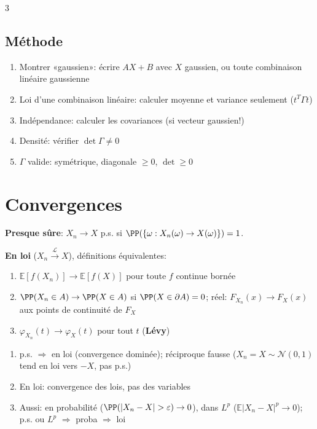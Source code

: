 \documentclass[12pt, a4paper]{article}
\newcommand{\E}{\mathbb{E}}
\begin{document}
\begin{multicols*}{3}
	\subsection{Méthode}
	\begin{enumerate}[\roman*.]
		\item Montrer «gaussien»: écrire $AX+B$ avec $X$ gaussien, ou toute combinaison linéaire gaussienne
		\item Loi d'une combinaison linéaire: calculer moyenne et variance seulement ($t^T\Gamma t$)
		\item Indépendance: calculer les covariances (si vecteur gaussien!)
		\item Densité: vérifier $\det\Gamma\neq0$
		\item $\Gamma$ valide: symétrique, diagonale $\geq0$, $\det\geq0$
	\end{enumerate}

	\colbreak
	\section{Convergences}
	\textbf{Presque sûre}: $X_n\to X$ p.s. si $\PP(\{\omega:X_n(\omega)\to X(\omega)\})=1$.

	\textbf{En loi} ($X_n\xrightarrow{\mathcal L}X$), définitions équivalentes:
	\begin{enumerate}[\roman*.]
		\item $\E[f(X_n)]\to\E[f(X)]$ pour toute $f$ continue bornée
		\item $\PP(X_n\in A)\to\PP(X\in A)$ si $\PP(X\in\partial A)=0$; réel: $F_{X_n}(x)\to F_X(x)$ aux points de continuité de $F_X$
		\item $\varphi_{X_n}(t)\to\varphi_X(t)$ pour tout $t$ (\textbf{Lévy})
	\end{enumerate}
	\begin{enumerate}[\roman*.]
		\item p.s. $\Rightarrow$ en loi (convergence dominée); réciproque fausse ($X_n=X\sim\mathcal N(0,1)$ tend en loi vers $-X$, pas p.s.)
		\item En loi: convergence des lois, pas des variables
		\item Aussi: en probabilité ($\PP(|X_n-X|>\varepsilon)\to0$), dans $L^p$ ($\E|X_n-X|^p\to0$); p.s. ou $L^p$ $\Rightarrow$ proba $\Rightarrow$ loi
	\end{enumerate}


\end{multicols*}
\end{document}
